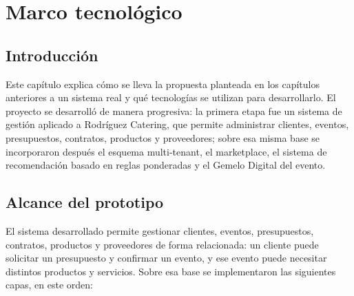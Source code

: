 
\chapter{Marco tecnológico}\label{cap:marco-tecnologico}

\section{Introducción}

Este capítulo explica cómo se lleva la propuesta planteada en los
capítulos anteriores a un sistema real y qué tecnologías se utilizan
para desarrollarlo. El proyecto se desarrolló de manera progresiva:
la primera etapa fue un sistema de gestión aplicado a Rodríguez
Catering, que permite administrar clientes, eventos, presupuestos,
contratos, productos y proveedores; sobre esa misma base se incorporaron
después el esquema multi-tenant, el marketplace, el sistema de
recomendación basado en reglas ponderadas y el Gemelo Digital del evento.

\section{Alcance del prototipo}\label{sec:alcance-prototipo}

El sistema desarrollado permite gestionar clientes, eventos,
presupuestos, contratos, productos y proveedores de forma relacionada: un
cliente puede solicitar un presupuesto y confirmar un evento, y ese
evento puede necesitar distintos productos y servicios. Sobre esa base se
implementaron las siguientes capas, en este orden:

